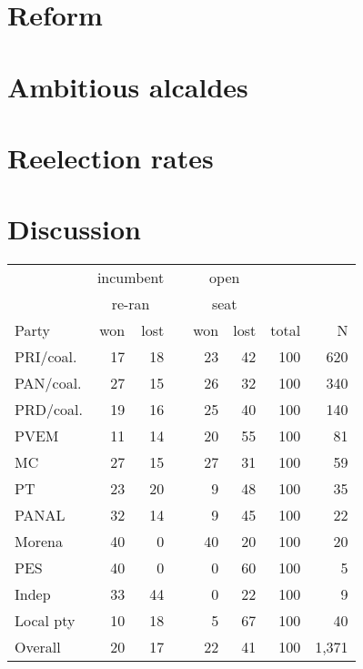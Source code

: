 \documentclass[letter,12pt]{article}
\begin{document}
\citep{magarInstReel.2017}

\citep{magar.2007ref.2015}

\citep{cain.etal.1987}

\section{Reform}

\section{Ambitious alcaldes}

\section{Reelection rates}

\section{Discussion}

\begin{tabular}{lrrcrrrr}
          & \multicolumn{2}{c}{incumbent} && \multicolumn{2}{c}{open} & & \\ 
          & \multicolumn{2}{c}{re-ran}    && \multicolumn{2}{c}{seat} & & \\ \cline{2-3} \cline{5-6}
Party     & won & lost && won & lost & total & N   \\ \hline
PRI/coal. & 17  & 18   && 23  & 42   & 100   & 620 \\
PAN/coal. & 27  & 15   && 26  & 32   & 100   & 340 \\
PRD/coal. & 19  & 16   && 25  & 40   & 100   & 140 \\
PVEM      & 11  & 14   && 20  & 55   & 100   & 81  \\
MC        & 27  & 15   && 27  & 31   & 100   & 59  \\
PT        & 23  & 20   && 9   & 48   & 100   & 35  \\
PANAL     & 32  & 14   && 9   & 45   & 100   & 22  \\
Morena    & 40  & 0    && 40  & 20   & 100   & 20  \\
PES       & 40  & 0    && 0   & 60   & 100   & 5   \\
Indep     & 33  & 44   && 0   & 22   & 100   & 9   \\
Local pty & 10  & 18   && 5   & 67   & 100   & 40  \\ \hline
Overall   & 20  & 17   && 22  & 41   & 100   & 1,371  \\ 
\end{tabular}




\end{document}
